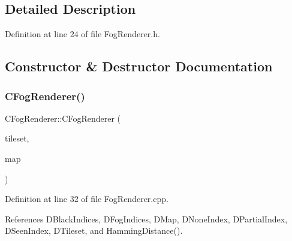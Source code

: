 \subsection{Detailed Description}


Definition at line 24 of file Fog\+Renderer.\+h.



\subsection{Constructor \& Destructor Documentation}
\hypertarget{classCFogRenderer_aa802bea4a0983b7cbcacf4ebfc1cf6a3}{}\label{classCFogRenderer_aa802bea4a0983b7cbcacf4ebfc1cf6a3} 
\subsubsection{\texorpdfstring{C\+Fog\+Renderer()}{CFogRenderer()}}
{\footnotesize\ttfamily C\+Fog\+Renderer\+::\+C\+Fog\+Renderer (\begin{DoxyParamCaption}\item[{std\+::shared\+\_\+ptr$<$ \hyperlink{classCGraphicTileset}{C\+Graphic\+Tileset} $>$}]{tileset,  }\item[{std\+::shared\+\_\+ptr$<$ \hyperlink{classCVisibilityMap}{C\+Visibility\+Map} $>$}]{map }\end{DoxyParamCaption})}



Definition at line 32 of file Fog\+Renderer.\+cpp.



References D\+Black\+Indices, D\+Fog\+Indices, D\+Map, D\+None\+Index, D\+Partial\+Index, D\+Seen\+Index, D\+Tileset, and Hamming\+Distance().


